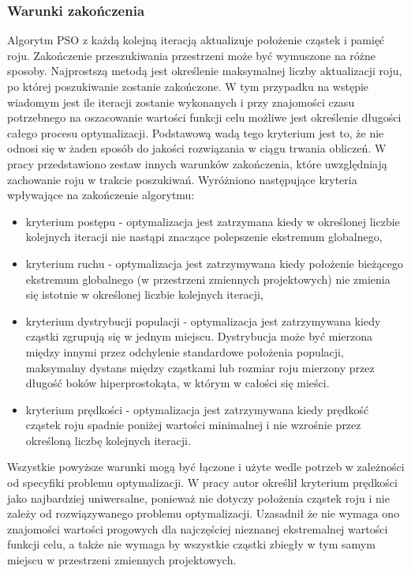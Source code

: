 \subsubsection{Warunki zakończenia}
Algorytm PSO z każdą kolejną iteracją aktualizuje położenie cząstek i pamięć roju. Zakończenie przeszukiwania przestrzeni może być wymuszone na różne sposoby. Najprostszą metodą jest określenie maksymalnej liczby aktualizacji roju, po której poszukiwanie zostanie zakończone. W tym przypadku na wstępie wiadomym jest ile iteracji zostanie wykonanych i przy znajomości czasu potrzebnego na oszacowanie wartości funkcji celu możliwe jest określenie długości całego procesu optymalizacji. Podstawową wadą tego kryterium jest to, że nie odnosi się w żaden sposób do jakości rozwiązania w ciągu trwania obliczeń. W pracy \parencite{Zielinski2007} przedstawiono zestaw innych warunków zakończenia, które uwzględniają zachowanie roju w trakcie poszukiwań. Wyróżniono następujące kryteria wpływające na zakończenie algorytmu:
\begin{itemize}
	\item kryterium postępu - optymalizacja jest zatrzymana kiedy w określonej liczbie kolejnych iteracji nie nastąpi znaczące polepszenie ekstremum globalnego,
	\item kryterium ruchu - optymalizacja jest zatrzymywana kiedy położenie bieżącego ekstremum globalnego (w przestrzeni zmiennych projektowych) nie zmienia się istotnie w określonej liczbie kolejnych iteracji,
	\item kryterium dystrybucji populacji - optymalizacja jest zatrzymywana kiedy cząstki zgrupują się w jednym miejscu. Dystrybucja może być mierzona między innymi przez odchylenie standardowe położenia populacji, maksymalny dystans między cząstkami lub rozmiar roju mierzony przez długość boków hiperprostokąta, w którym w całości się mieści.  
	\item kryterium prędkości - optymalizacja jest zatrzymywana kiedy prędkość cząstek roju spadnie poniżej wartości minimalnej i nie wzrośnie przez określoną liczbę kolejnych iteracji. 
\end{itemize}
Wszystkie powyższe warunki mogą być łączone i użyte wedle potrzeb w zależności od specyfiki problemu optymalizacji. W pracy \cite{Banach2017} autor określił kryterium prędkości jako najbardziej uniwersalne, ponieważ nie dotyczy położenia cząstek roju i nie zależy od rozwiązywanego problemu optymalizacji. Uzasadnił że nie wymaga ono znajomości wartości progowych dla najczęściej nieznanej ekstremalnej wartości funkcji celu, a także nie wymaga by wszystkie cząstki zbiegły w tym samym miejscu w przestrzeni zmiennych projektowych.
